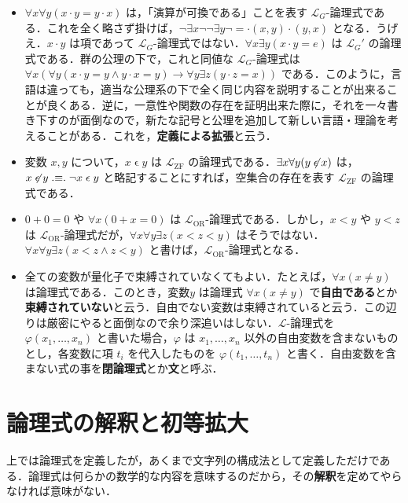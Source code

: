 \documentclass[a4j,xelatex,ja=standard]{ltjsarticle}
\begin{document}
\begin{example}
 \begin{itemize}
  \item $\forall x \forall y (x \cdot y = y \cdot x)$ は，「演算が可換である」ことを表す $\mathcal{L}_G$-論理式である．これを全く略さず掛けば，$\neg \exists x \neg \neg \exists y \neg = \cdot(x, y) \cdot(y, x)$ となる．うげえ．$x \cdot y$ は項であって $\mathcal{L}_G$-論理式ではない．$\forall x \exists y (x \cdot y = e)$ は $\mathcal{L}_G'$ の論理式である．群の公理の下で，これと同値な $\mathcal{L}_G$-論理式は $\forall x (\forall y (x \cdot y = y \wedge y \cdot x = y) \rightarrow \forall y \exists z (y \cdot z = x))$ である．このように，言語は違っても，適当な公理系の下で全く同じ内容を説明することが出来ることが良くある．逆に，一意性や関数の存在を証明出来た際に，それを一々書き下すのが面倒なので，新たな記号と公理を追加して新しい言語・理論を考えることがある．これを，{\bfseries 定義による拡張}と云う．
  \item 変数 $x, y$ について，$x \mathrel{\epsilon} y$ は $\mathcal{L}_\mathrm{ZF}$ の論理式である．$\exists x \forall y (y \not\mathrel{\epsilon} x)$ は，$x \not\mathrel{\epsilon} y \mathrel{.{\equiv}.} \neg x \mathrel{\epsilon} y$ と略記することにすれば，空集合の存在を表す $\mathcal{L}_\mathrm{ZF}$ の論理式である．
  \item $0 + 0 = 0$ や $\forall x (0 + x = 0)$ は $\mathcal{L}_\mathrm{OR}$-論理式である．しかし，$x < y$ や $y < z$ は $\mathcal{L}_\mathrm{OR}$-論理式だが，$\forall x \forall y \exists z (x < z < y)$ はそうではない．$\forall x \forall y \exists z (x < z \wedge z < y)$ と書けば，$\mathcal{L}_\mathrm{OR}$-論理式となる．
  \item 全ての変数が量化子で束縛されていなくてもよい．たとえば，$\forall x (x \neq y)$ は論理式である．このとき，変数$y$ は論理式 $\forall x (x \neq y)$ で{\bfseries 自由である}とか{\bfseries 束縛されていない}と云う．自由でない変数は束縛されていると云う．この辺りは厳密にやると面倒なので余り深追いはしない．$\mathcal{L}$-論理式を $\varphi(x_1, \dots, x_n)$ と書いた場合，$\varphi$ は $x_1, \dots, x_n$ 以外の自由変数を含まないものとし，各変数に項 $t_i$ を代入したものを $\varphi(t_1, \dots, t_n)$ と書く．自由変数を含まない式の事を{\bfseries 閉論理式}とか{\bfseries 文}と呼ぶ．
 \end{itemize}
\end{example}

\section{論理式の解釈と初等拡大}
上では論理式を定義したが，あくまで文字列の構成法として定義しただけである．論理式は何らかの数学的な内容を意味するのだから，その{\bfseries 解釈}を定めてやらなければ意味がない．
\end{document}
